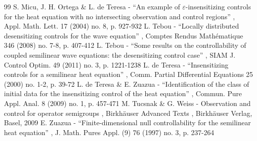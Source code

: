 \documentclass[11pt]{article}
\numberwithin{equation}{section}
\theoremstyle{definition}
\begin{document}
\begin{thebibliography}{99}
 S. Micu, J. H. Ortega \& L. de Teresa - “An example of $\varepsilon $-insensitizing controls for the heat equation with no intersecting observation and control regions” , Appl. Math. Lett. 17 (2004) no. 8, p. 927-932
 L. Tebou - “Locally distributed desensitizing controls for the wave equation” , Comptes Rendus Mathématique 346 (2008) no. 7-8, p. 407-412
 L. Tebou - “Some results on the controllability of coupled semilinear wave equations: the desensitizing control case” , SIAM J. Control Optim. 49 (2011) no. 3, p. 1221-1238
 L. de Teresa - “Insensitizing controls for a semilinear heat equation” , Comm. Partial Differential Equations 25 (2000) no. 1-2, p. 39-72
 L. de Teresa \& E. Zuazua - “Identification of the class of initial data for the insensitizing control of the heat equation” , Commun. Pure Appl. Anal. 8 (2009) no. 1, p. 457-471
 M. Tucsnak \& G. Weiss - Observation and control for operator semigroups , Birkhäuser Advanced Texts , Birkhäuser Verlag, Basel, 2009
 E. Zuazua - “Finite-dimensional null controllability for the semilinear heat equation” , J. Math. Pures Appl. (9) 76 (1997) no. 3, p. 237-264
\end{thebibliography}
\end{document}
